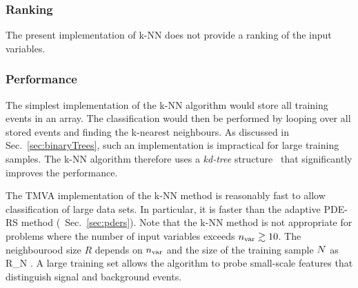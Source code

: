 \subsubsection{Ranking}

The present implementation of k-NN does not provide a ranking of the input variables.

\subsubsection{Performance}

The simplest implementation of the k-NN algorithm would store all training events in an array. 
The classification would then be performed by looping over all stored events and finding 
the k-nearest neighbours. As discussed in Sec.~\ref{sec:binaryTrees}, such an implementation
is impractical for large training samples. The k-NN algorithm therefore uses a {\em kd-tree} 
structure~\cite{kd-tree} that significantly improves the performance.

The TMVA implementation of the k-NN method is reasonably fast to allow classification of large 
data sets. In particular, it is faster than the adaptive PDE-RS method (\cf\  Sec.~\ref{sec:pders}).
Note that the k-NN method is not appropriate for problems where the number of input 
variables exceeds ${n_\text{var}}\gtrsim 10$. The neighbourood size $R$ depends on ${n_\text{var}}$
and the size of the training sample ${N}$ as
\beq
  R_{N} \propto {}\;.
\eeq
A large training set allows the algorithm to probe small-scale features that distinguish 
signal and background events.

